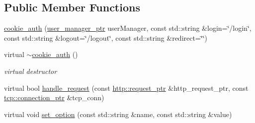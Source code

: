 \subsection*{Public Member Functions}
\begin{DoxyCompactItemize}
\item 
\hyperlink{classpion_1_1http_1_1cookie__auth_a769336238f9a20b74eb29be7db6e8bd3}{cookie\-\_\-auth} (\hyperlink{namespacepion_a20602680730b88b8efd08b3730d601af}{user\-\_\-manager\-\_\-ptr} user\-Manager, const std\-::string \&login=\char`\"{}/login\char`\"{}, const std\-::string \&logout=\char`\"{}/logout\char`\"{}, const std\-::string \&redirect=\char`\"{}\char`\"{})
\item 
virtual \hyperlink{classpion_1_1http_1_1cookie__auth_af161887edda25c1e95bae51a74dc843a}{$\sim$cookie\-\_\-auth} ()
\begin{DoxyCompactList}\small\item\em virtual destructor \end{DoxyCompactList}\item 
virtual bool \hyperlink{classpion_1_1http_1_1cookie__auth_a585dc707d10e0e86ba33efdfc330c83a}{handle\-\_\-request} (const \hyperlink{namespacepion_1_1http_ace432b70a9459d50ff4969a7a47f0ccb}{http\-::request\-\_\-ptr} \&http\-\_\-request\-\_\-ptr, const \hyperlink{namespacepion_1_1tcp_a6c9b7497068009f6d81d95ec0b0627d6}{tcp\-::connection\-\_\-ptr} \&tcp\-\_\-conn)
\item 
virtual void \hyperlink{classpion_1_1http_1_1cookie__auth_a87eb9ebf16f524aaf672465c37299772}{set\-\_\-option} (const std\-::string \&name, const std\-::string \&value)
\end{DoxyCompactItemize}
